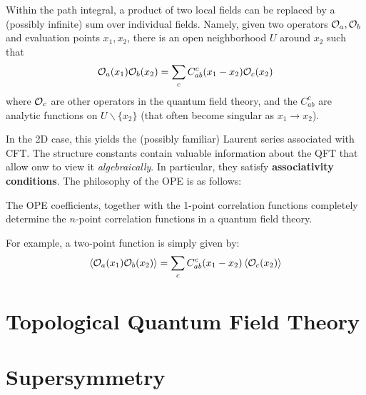 		\begin{prop}
			 Within the path integral, a product of two local fields can be replaced by a (possibly infinite) sum over individual fields. Namely, given two operators $\mathcal O_a, \mathcal O_b$ and evaluation points $x_1, x_2$, there is an open neighborhood $U$ around $x_2$ such that
			\begin{equation}
				\mathcal O_a (x_1) \mathcal O_b(x_2) = \sum_c C_{ab}^c(x_1-x_2) \mathcal O_c(x_2)
			\end{equation}
		where $\mathcal O_c$ are other operators in the quantum field theory, and the $C_{ab}^c$ are analytic functions on $U \backslash \{ x_2 \}$ (that often become singular as $x_1 \to x_2$).
		\end{prop}
	
		In the 2D case, this yields the (possibly familiar) Laurent series associated with CFT. The structure constants contain valuable information about the QFT that allow onw to view it \emph{algebraically}. In particular, they satisfy \textbf{associativity conditions}. The philosophy of the OPE is as follows: %
		\begin{idea}
			The OPE coefficients, together with the 1-point correlation functions completely determine the $n$-point correlation functions in a quantum field theory. 
		\end{idea}
	\noindent 	For example, a two-point function is simply given by:
		\begin{equation}
			\left< \mathcal O_a(x_1) \mathcal O_b(x_2) \right> = \sum_c C^c_{ab}(x_1 - x_2) \left< \mathcal O_c (x_2) \right>
		\end{equation}
	
	
	
	\section{Topological Quantum Field Theory} %
	\label{sec:topological_quantum_field_theory}
	

	\section{Supersymmetry} %
	\label{sec:supersymmetry}

